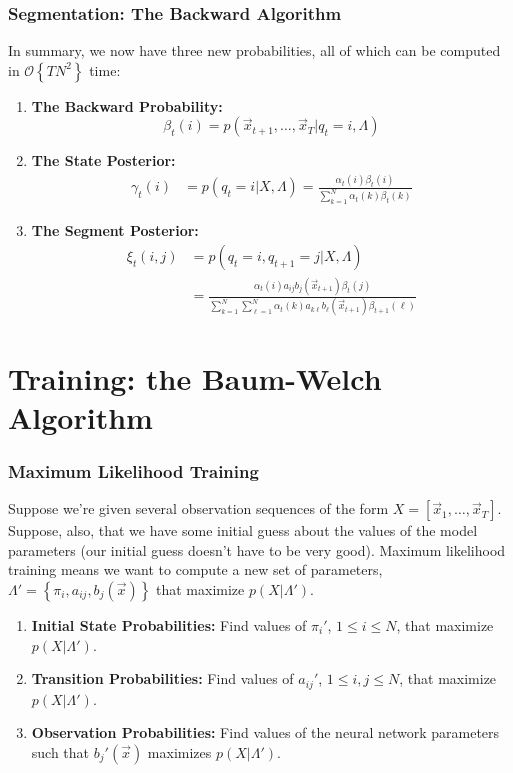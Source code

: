 \documentclass{beamer}
\begin{document}
\begin{frame}
  \frametitle{Segmentation: The Backward Algorithm}

  In summary, we now have three new probabilities, all of which can be
  computed in ${\mathcal O}\left\{TN^2\right\}$ time:
  \begin{enumerate}
  \item {\bf The Backward Probability:}
    \[
    \beta_t(i) = p(\vec{x}_{t+1},\ldots,\vec{x}_T|q_t=i,\Lambda)
    \]
  \item {\bf The State Posterior:}
    \begin{align*}
      \gamma_t(i) & = p(q_t=i|X,\Lambda)
      = \frac{\alpha_t(i)\beta_t(i)}{\sum_{k=1}^N\alpha_t(k)\beta_t(k)}
    \end{align*}
  \item {\bf The Segment Posterior:}
    \begin{align*}
      \xi_t(i,j) & = p(q_t=i,q_{t+1}=j|X,\Lambda)\\
      &= \frac{\alpha_t(i)a_{ij}b_j(\vec{x}_{t+1})\beta_t(j)}{\sum_{k=1}^N\sum_{\ell=1}^N\alpha_t(k)a_{k\ell}b_\ell(\vec{x}_{t+1})\beta_{t+1}(\ell)}
    \end{align*}
  \end{enumerate}
\end{frame}

\section[Training]{Training: the Baum-Welch Algorithm}
\setcounter{subsection}{1}

\begin{frame}
  \frametitle{Maximum Likelihood Training}
  
  Suppose we're given several observation sequences of the form
  $X=[\vec{x}_1,\ldots,\vec{x}_T]$.  Suppose, also, that we have some
  initial guess about the values of the model parameters (our initial
  guess doesn't have to be very good).  Maximum likelihood training
  means we want to compute a new set of parameters,
  $\Lambda'=\left\{\pi_i,a_{ij},b_j(\vec{x})\right\}$ that maximize
  $p(X|\Lambda')$.
  \begin{enumerate}
  \item {\bf Initial State Probabilities:} Find values of $\pi_i'$, $1\le
    i\le N$, that maximize $p(X|\Lambda')$.
  \item {\bf Transition Probabilities:} Find values of $a_{ij}'$, $1\le
    i,j\le N$, that maximize $p(X|\Lambda')$.
  \item {\bf Observation Probabilities:} Find values of the neural
    network parameters such that $b_j'(\vec{x})$ maximizes $p(X|\Lambda')$.
  \end{enumerate}
\end{frame}
  
\end{document}
